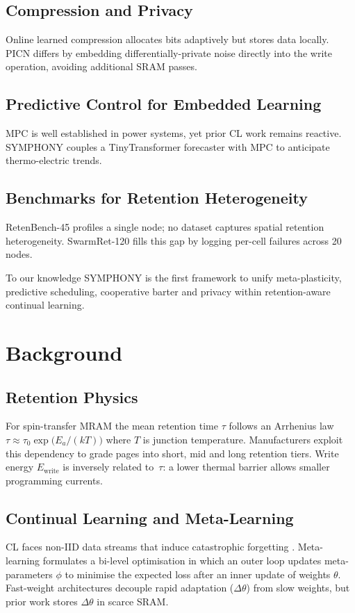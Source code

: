 \documentclass{article}
\begin{document}
\subsection{Compression and Privacy}
Online learned compression allocates bits adaptively \cite{caccia-2019-online} but stores data locally. PICN differs by embedding differentially-private noise directly into the write operation, avoiding additional SRAM passes.

\subsection{Predictive Control for Embedded Learning}
MPC is well established in power systems, yet prior CL work remains reactive. SYMPHONY couples a TinyTransformer forecaster with MPC to anticipate thermo-electric trends.

\subsection{Benchmarks for Retention Heterogeneity}
RetenBench-45 profiles a single node; no dataset captures spatial retention heterogeneity. SwarmRet-120 fills this gap by logging per-cell failures across 20 nodes.

To our knowledge SYMPHONY is the first framework to unify meta-plasticity, predictive scheduling, cooperative barter and privacy within retention-aware continual learning.

\section{Background}\label{sec:background}
\subsection{Retention Physics}
For spin-transfer MRAM the mean retention time $\tau$ follows an Arrhenius law $\tau \approx \tau_{0} \exp\bigl( E_{a} /(kT) \bigr)$ where $T$ is junction temperature. Manufacturers exploit this dependency to grade pages into short, mid and long retention tiers. Write energy $E_{\text{write}}$ is inversely related to~$\tau$: a lower thermal barrier allows smaller programming currents.

\subsection{Continual Learning and Meta-Learning}
CL faces non-IID data streams that induce catastrophic forgetting \cite{kirkpatrick-2016-overcoming}. Meta-learning formulates a bi-level optimisation in which an outer loop updates meta-parameters $\phi$ to minimise the expected loss after an inner update of weights $\theta$. Fast-weight architectures decouple rapid adaptation ($\Delta\theta$) from slow weights, but prior work stores $\Delta\theta$ in scarce SRAM.
\end{document}
